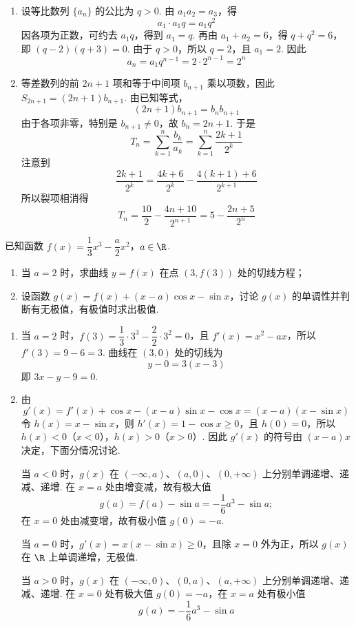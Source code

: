 \begin{solution}
\begin{enumerate}
\item 设等比数列 \(\{a_n\}\) 的公比为 \(q>0\). 由 \(a_1a_2=a_3\)，得
\[
a_1\cdot a_1q=a_1q^2
\]
因各项为正数，可约去 \(a_1q\)，得到 \(a_1=q\). 再由 \(a_1+a_2=6\)，得 \(q+q^2=6\)，即 \((q-2)(q+3)=0\). 由于 \(q>0\)，所以 \(q=2\)，且 \(a_1=2\). 因此
\[
a_n=a_1q^{n-1}=2\cdot2^{n-1}=2^n
\]
\item 等差数列的前 \(2n+1\) 项和等于中间项 \(b_{n+1}\) 乘以项数，因此 \(S_{2n+1}=(2n+1)b_{n+1}\). 由已知等式，
\[
(2n+1)b_{n+1}=b_nb_{n+1}
\]
由于各项非零，特别是 \(b_{n+1}\ne0\)，故 \(b_n=2n+1\). 于是
\[
T_n=\sum_{k=1}^n\dfrac{b_k}{a_k}=\sum_{k=1}^n\dfrac{2k+1}{2^k}
\]
注意到
\[
\dfrac{2k+1}{2^k}=\dfrac{4k+6}{2^k}-\dfrac{4(k+1)+6}{2^{k+1}}
\]
所以裂项相消得
\[
T_n=\dfrac{10}{2}-\dfrac{4n+10}{2^{n+1}}=5-\dfrac{2n+5}{2^n}
\]
\end{enumerate}
\end{solution}

\begin{problem}
已知函数 \(f(x)=\dfrac13x^3-\dfrac a2x^2\)，\(a\in\R\).

\begin{enumerate}
\item 当 \(a=2\) 时，求曲线 \(y=f(x)\) 在点 \((3,f(3))\) 处的切线方程；
\item 设函数 \(g(x)=f(x)+(x-a)\cos x-\sin x\)，讨论 \(g(x)\) 的单调性并判断有无极值，有极值时求出极值.
\end{enumerate}
\end{problem}

\begin{solution}
\begin{enumerate}
\item 当 \(a=2\) 时，\(f(3)=\dfrac13\cdot3^3-\dfrac22\cdot3^2=0\)，且
\(f'(x)=x^2-ax\)，所以 \(f'(3)=9-6=3\). 曲线在 \((3,0)\) 处的切线为
\[
y-0=3(x-3)
\]
即 \(3x-y-9=0\).
\item 由
\[
g'(x)=f'(x)+\cos x-(x-a)\sin x-\cos x=(x-a)(x-\sin x)
\]
令 \(h(x)=x-\sin x\)，则 \(h'(x)=1-\cos x\geq0\)，且 \(h(0)=0\)，所以 \(h(x)<0\)（\(x<0\)），\(h(x)>0\)（\(x>0\)）. 因此 \(g'(x)\) 的符号由 \((x-a)x\) 决定，下面分情况讨论.

当 \(a<0\) 时，\(g(x)\) 在 \(\left(-\infty,a\right)\)、\(\left(a,0\right)\)、\(\left(0,+\infty\right)\) 上分别单调递增、递减、递增. 在 \(x=a\) 处由增变减，故有极大值
\[
g(a)=f(a)-\sin a=-\dfrac16a^3-\sin a;
\]
在 \(x=0\) 处由减变增，故有极小值 \(g(0)=-a\).

当 \(a=0\) 时，\(g'(x)=x(x-\sin x)\geq0\)，且除 \(x=0\) 外为正，所以 \(g(x)\) 在 \(\R\) 上单调递增，无极值.

当 \(a>0\) 时，\(g(x)\) 在 \(\left(-\infty,0\right)\)、\(\left(0,a\right)\)、\(\left(a,+\infty\right)\) 上分别单调递增、递减、递增. 在 \(x=0\) 处有极大值 \(g(0)=-a\)，在 \(x=a\) 处有极小值
\[
g(a)=-\dfrac16a^3-\sin a
\]
\end{enumerate}
\end{solution}

